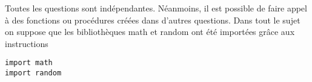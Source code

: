 
Toutes les questions
sont indépendantes. Néanmoins, il est possible de faire appel à des fonctions ou procédures créées dans d’autres
questions. Dans tout le sujet on suppose que les bibliothèques math %
et random ont été importées grâce
aux instructions
\begin{lstlisting}
import math
import random
\end{lstlisting}



\fi


